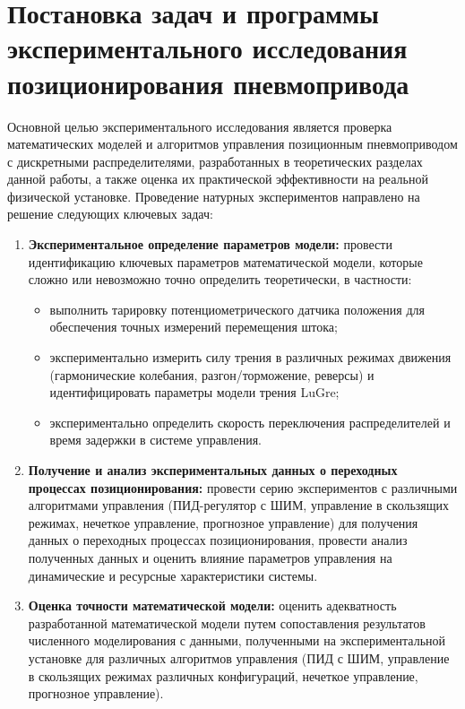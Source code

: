 \section{Постановка задач и программы экспериментального исследования позиционирования пневмопривода}
Основной целью экспериментального исследования является проверка математических моделей и алгоритмов управления позиционным
пневмоприводом с дискретными распределителями, разработанных в теоретических разделах данной работы,
а также оценка их практической эффективности на реальной физической установке.
Проведение натурных экспериментов направлено на решение следующих ключевых задач:

\begin{enumerate}
	\item \textbf{Экспериментальное определение параметров модели:}
	      провести идентификацию ключевых параметров математической модели,
	      которые сложно или невозможно точно определить теоретически, в частности:

	      \begin{itemize}
		      \item выполнить тарировку потенциометрического датчика положения
		            для обеспечения точных измерений перемещения штока;
		      \item экспериментально измерить силу трения в различных режимах движения
		            (гармонические колебания, разгон/торможение, реверсы) и
		            идентифицировать параметры модели трения LuGre;
		      \item экспериментально определить скорость переключения распределителей
		            и время задержки в системе управления.
	      \end{itemize}
	\item \textbf{Получение и анализ экспериментальных данных о переходных процессах позиционирования:}
	      провести серию экспериментов с различными алгоритмами управления (ПИД-регулятор с ШИМ,
	      управление в скользящих режимах, нечеткое управление, прогнозное управление) для получения данных о переходных процессах
	      позиционирования, провести анализ полученных данных и оценить влияние параметров управления
	      на динамические и ресурсные характеристики системы.

	\item \textbf{Оценка точности математической модели:}
	      оценить адекватность разработанной математической модели путем сопоставления результатов
	      численного моделирования с данными, полученными на экспериментальной установке для
	      различных алгоритмов управления (ПИД с ШИМ, управление в скользящих режимах
	      различных конфигураций, нечеткое управление, прогнозное управление).
\end{enumerate}

